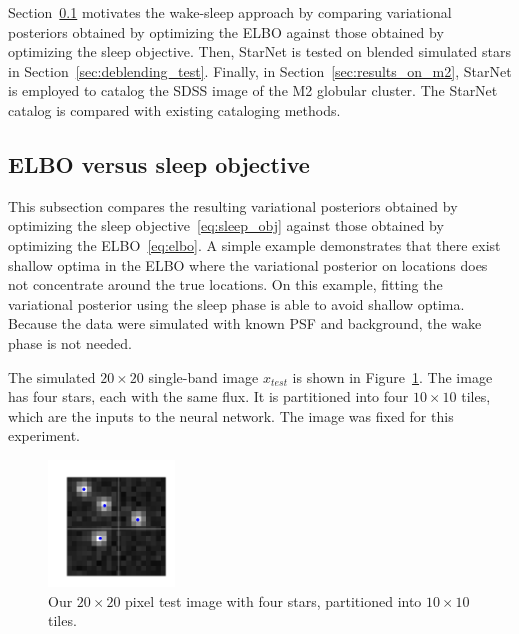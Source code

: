 
Section~\ref{sec:estep_sleep_compare} motivates the wake-sleep approach by comparing variational posteriors obtained by optimizing the ELBO against those obtained by optimizing the sleep objective. 
Then, StarNet is tested on blended simulated stars in Section~\ref{sec:deblending_test}. 
Finally, in Section~\ref{sec:results_on_m2}, StarNet is employed to catalog the SDSS image of the M2 globular cluster. The StarNet catalog is compared with existing cataloging methods. 

\subsection{ELBO versus sleep objective}
\label{sec:estep_sleep_compare}

This subsection compares the resulting variational posteriors obtained by optimizing the sleep objective~\eqref{eq:sleep_obj} 
against those obtained by optimizing the ELBO~\eqref{eq:elbo}.
A simple example demonstrates that there exist shallow optima in the ELBO where the variational posterior on locations does not concentrate around the true locations.
On this example, fitting the variational posterior using the sleep phase is able to avoid shallow optima. 
Because the data were simulated with known PSF and background, the wake phase is not needed. 

The simulated $20\times20$ single-band image $x_{test}$ is shown in Figure~\ref{fig:toy_example}.
The image has four stars, each with the same flux. It is partitioned into four $10\times 10$ tiles, which are the inputs to the neural network. 
The image was fixed for this experiment. 

\begin{figure}[!h]
    \centering
    \vspace{-1em}
    \includegraphics[width = 0.3\textwidth]{figures/vi_sleep_ex_figure.png}
    \vspace{-1.7em}
    \caption{Our $20\times 20$ pixel test image with four stars, partitioned into $10\times 10$ tiles. }
    \label{fig:toy_example}
\end{figure}

